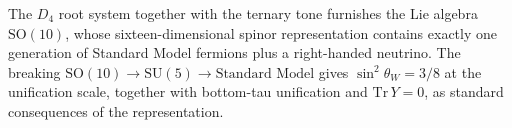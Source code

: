 \begin{proposition}
The $D_4$ root system together with the ternary tone furnishes the Lie algebra $\mathrm{SO}(10)$, whose sixteen-dimensional spinor representation contains exactly one generation of Standard Model fermions plus a right-handed neutrino. The breaking $\mathrm{SO}(10) \to \mathrm{SU}(5) \to \text{Standard Model}$ gives $\sin^2\theta_W = 3/8$ at the unification scale, together with bottom-tau unification and $\mathrm{Tr}\,Y = 0$, as standard consequences of the representation.
\end{proposition}

